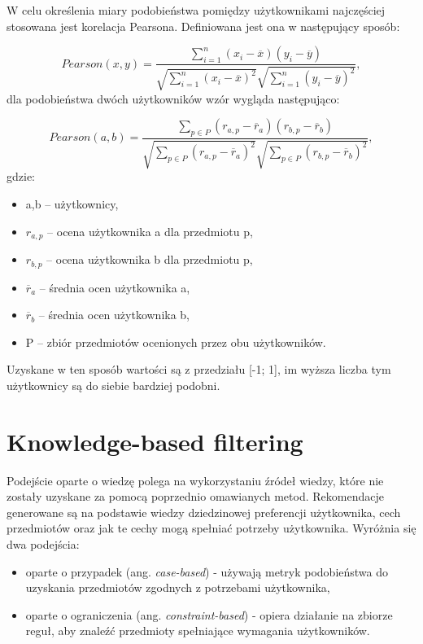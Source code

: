 W celu określenia miary podobieństwa pomiędzy użytkownikami najczęściej stosowana jest korelacja Pearsona. Definiowana jest ona w następujący sposób:

\begin{equation}
Pearson(x,y) = \frac{\sum\limits_{i=1}^n(x_i - \overline{x})(y_i - \overline{y})}{\sqrt{\sum\limits_{i=1}^n(x_i - \overline{x})^2}\sqrt{\sum\limits_{i=1}^n(y_i - \overline{y})^2}},
\end{equation}
dla podobieństwa dwóch użytkowników wzór wygląda następująco:

\begin{equation}
Pearson(a,b) = \frac{\sum\limits_{p \in P}(r_{a,p} - \overline{r}_a)(r_{b,p} - \overline{r}_b)}{\sqrt{\sum\limits_{p \in P}(r_{a,p} - \overline{r}_a)^2}\sqrt{\sum\limits_{p \in P}(r_{b,p} - \overline{r}_b)^2}},
\end{equation} gdzie:
\begin{itemize}
    \item a,b -- użytkownicy,
    \item $r_{a,p}$ -- ocena użytkownika a dla przedmiotu p,
    \item $r_{b,p}$ -- ocena użytkownika b dla przedmiotu p,
    \item $\overline{r}_a$ -- średnia ocen użytkownika a,
    \item $\overline{r}_b$ -- średnia ocen użytkownika b,
    \item P -- zbiór przedmiotów ocenionych przez obu użytkowników.
\end{itemize}

Uzyskane w ten sposób wartości są z przedziału [-1; 1], im wyższa liczba tym użytkownicy są do siebie bardziej podobni.

\section{Knowledge-based filtering}

Podejście oparte o wiedzę polega na wykorzystaniu źródeł wiedzy, które nie zostały uzyskane za pomocą poprzednio omawianych metod. Rekomendacje generowane są na podstawie wiedzy dziedzinowej preferencji użytkownika, cech przedmiotów oraz jak te cechy mogą spełniać potrzeby użytkownika. Wyróżnia się dwa podejścia:
\begin{itemize}
    \item oparte o przypadek (ang. \textit{case-based}) - używają  metryk podobieństwa do uzyskania przedmiotów zgodnych z potrzebami użytkownika,
    \item oparte o ograniczenia (ang. \textit{constraint-based}) - opiera działanie na zbiorze reguł, aby znaleźć przedmioty spełniające wymagania użytkowników.

\end{itemize}

